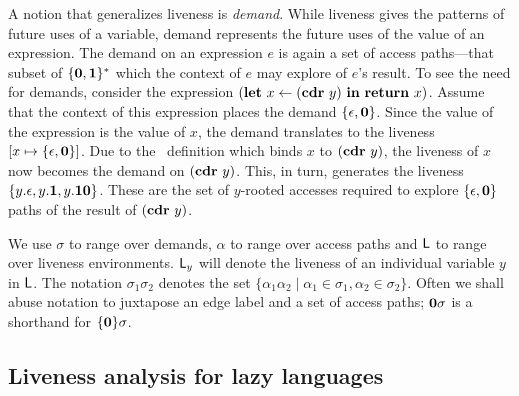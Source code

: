 \documentclass[preprint, 9pt]{sigplanconf}
\begin{document}
A notion  that generalizes liveness  is {\em demand}.   While liveness
gives the patterns of future uses of a variable, demand represents the
future uses of the value of an expression.  The demand on an expression
$e$   is   again   a   set    of   access   paths---that   subset   of
$\{\mathbf{0},\mathbf{1}\}^\ast$ which the  context of $e$ may  explore of $e$'s
result.   To see  the need  for demands,  consider the expression
$(\mbox{$\mathbf{ let}$}~x\leftarrow  (\mbox{$\mathbf{cdr}$}~y)~\mbox{$\mathbf{ in}$}~   \mbox{$\mathbf{ return}$}~x)$.   Assume   that  the
context of this expression places  the demand $\lbrace \epsilon, \mathbf{0}
\rbrace$. Since the  value of the expression is the  value of $x$, the
demand translates to the liveness  $[x \mapsto \lbrace \epsilon, \mathbf{0}
  \rbrace]$.   Due  to  the  \LET\   definition  which  binds  $x$  to
$(\mbox{$\mathbf{cdr}$}~y)$, the liveness of $x$  now becomes the demand on $(\mbox{$\mathbf{cdr}$}~y)$.
This, in  turn, generates  the liveness $\lbrace  y.\epsilon, y.\mathbf{1},
y.\mathbf{1}\mathbf{0}  \rbrace$.   These are  the  set  of $y$-rooted  accesses
required to  explore $\lbrace  \epsilon, \mathbf{0}  \rbrace$ paths  of the
result of $(\mbox{$\mathbf{cdr}$}~y)$.
  
We use $\sigma$  to range over demands, $\alpha$ to  range over access
paths  and $\mathsf{L}$  to range  over liveness  environments. $\mathsf{L}_y$  will
denote  the liveness  of an  individual  variable $y$  in $\mathsf{L}$.   The
notation $\sigma_1\sigma_2$ denotes  the set $\lbrace \alpha_1\alpha_2
\mid \alpha_1  \in \sigma_1, \alpha_2 \in  \sigma_2\rbrace$.  Often we
shall abuse  notation to juxtapose an  edge label and a  set of access
paths; $\mathbf{0}\sigma$ is a shorthand for $\lbrace\mathbf{0}\rbrace\sigma$.



\renewcommand{\pp}[2]{\ensuremath{#1\!\!:\!#2}} %



\subsection{Liveness analysis for lazy languages}
\label{sec:liveness-analysis}
  
\end{document}
